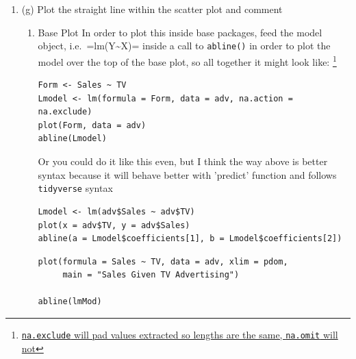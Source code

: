 \documentclass[11pt]{article}
\begin{document}
\begin{enumerate}
\begin{enumerate}
So the critical t-value is -1.7 and from the summary call from before we
have that the t-statistic is 17, which far exceeds this, as a matter of
fact further over to the right the p-value is reported at
\(\alpha = 10^{-16}\).

In practice you'd just read off the \emph{p}-values and pick the ones with
\texttt{*} to the right of them, the more \texttt{*} the more significance.

Hence we reject the hypothesis that no relationship exists at an
extremely low probability of incorrectly doing so (i.e. low probability
of commiting type 1 error).
\end{enumerate}
\item (g) Plot the straight line within the scatter plot and comment
\label{sec:org9374a53}
\begin{enumerate}
\item Base Plot
\label{sec:orgccf5811}
In order to plot this inside base packages, feed the model object,
i.e. =lm(Y\textasciitilde{}X)= inside a call to \texttt{abline()} in order to plot the model
over the top of the base plot, so all together it might look
like: \footnote{\href{https://stats.stackexchange.com/a/11028}{\texttt{na.exclude} will pad
values extracted so lengths are the same, \texttt{na.omit} will not}}

\begin{verbatim}
Form <- Sales ~ TV
Lmodel <- lm(formula = Form, data = adv, na.action = na.exclude)
plot(Form, data = adv)
abline(Lmodel)
\end{verbatim}

Or you could do it like this even, but I think the way above is better
syntax because it will behave better with 'predict' function and follows
\texttt{tidyverse} syntax

\begin{verbatim}
Lmodel <- lm(adv$Sales ~ adv$TV)
plot(x = adv$TV, y = adv$Sales)
abline(a = Lmodel$coefficients[1], b = Lmodel$coefficients[2])
\end{verbatim}

\begin{verbatim}
plot(formula = Sales ~ TV, data = adv, xlim = pdom,
     main = "Sales Given TV Advertising")

abline(lmMod)
\end{verbatim}


\end{enumerate}
\end{enumerate}
\end{document}
